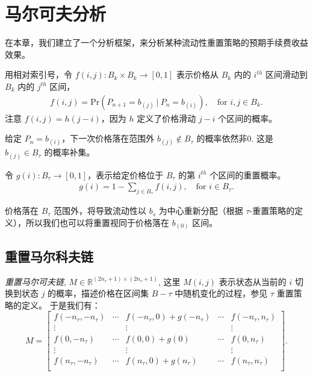 \documentclass[sigconf, dvipsnames]{acmart}
\newcommand{\dcp}[1]{\textcolor{blue}{{\scriptsize{David:}}#1}}
\begin{document}
\section{马尔可夫分析}\label{sec:markov}

\quad 在本章，我们建立了一个分析框架，来分析某种流动性重置策略的预期手续费收益效果。


\begin{definition}\label{def:f}
用相对索引号，令 $f(i,j) \colon B_{k}\times B_{k} \to [0,1]$ 表示价格从 $B_{k}$ 内的 $i^{th}$ 区间滑动到 $B_{k}$ 内的 $j^{th}$ 区间，
\begin{align}
    f(i,j) = \mathrm{Pr}\left(P_{n+1} = b_{(j)}~|~P_n = b_{(i)}\right), \quad \text{for } i,j \in B_k.
\end{align}
注意 $f(i,j) = h(j-i)$，因为 $h$ 定义了价格滑动 $j-i$ 个区间的概率。 
\end{definition}

给定 $P_n = b_{(i)}$，下一次价格落在范围外 $b_{(j)} \notin B_{\tau}$ 的概率依然非0. 这是 $b_{(j)} \in B_{\tau}$ 的概率补集。
%
\begin{definition}
令 $g(i) \colon B_{\tau} \to [0,1]$，表示给定价格位于 $B_{\tau}$ 的第 $i^{th}$ 个区间的重置概率。
\begin{align}
    g(i) = 1 - \sum_{j \in B_{\tau}} f(i,j), \quad \text{for } i \in B_{\tau}.
\end{align}
\end{definition}
价格落在 $B_{\tau}$ 范围外，将导致流动性以 $b_s$ 为中心重新分配（根据 $\tau$-重置策略的定义），所以我们也可以将重置视同于价格落在 $b_{(0)}$ 区间。

\subsection{重置马尔科夫链}

\begin{definition}
\textit{重置马尔可夫链}, $M \in \mathbb{R}^{(2n_{\tau}+1) \times (2n_{\tau}+1)}$, 
这里 $M(i,j)$ 表示状态从当前的 $i$ 切换到状态 $j$ 的概率，描述价格在区间集 $B-{\tau}$ 中随机变化的过程，参见 $\tau$ 重置策略的定义。
于是我们有：
\[
M = 
\begin{bmatrix}
  f(-n_{\tau},-n_{\tau}) & \cdots  &f(-n_{\tau}, 0) + g(-n_{\tau}) & \cdots & f(-n_{\tau},n_{\tau}) \\
  \vdots &  & \vdots & & \vdots\\
  f(0,-n_{\tau}) & \cdots  &f(0, 0) + g(0) & \cdots & f(0,n_{\tau}) \\
  \vdots &  & \vdots & & \vdots\\
  f(n_{\tau},-n_{\tau}) & \cdots  &f\left(n_{\tau},0\right) + g(n_{\tau}) & \cdots & f(n_{\tau},n_{\tau}) \\
\end{bmatrix}.
\]
\end{definition}
\end{document}
